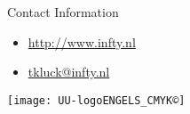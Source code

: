 \documentclass[final]{beamer}
\newlength{\sepwid}
\newlength{\onecolwid}
\begin{document}
\begin{frame}[t]
\begin{columns}[t]
\begin{column}{\onecolwid}

\begin{alertblock}{Contact Information}

\begin{minipage}{25cm}
\begin{itemize}
\item \href{http://www.infty.nl/}{\color{black} http://www.infty.nl}
\item \href{mailto:tkluck@infty.nl}{\color{black} tkluck@infty.nl}
\end{itemize}
\end{minipage}
\begin{minipage}{2cm}
\texttt{[image: UU-logoENGELS\_CMYK©]}
\end{minipage}

\end{alertblock}



\end{column} %

\begin{column}{\sepwid}\end{column} %

\end{columns} %

\end{frame} %
\end{document}
